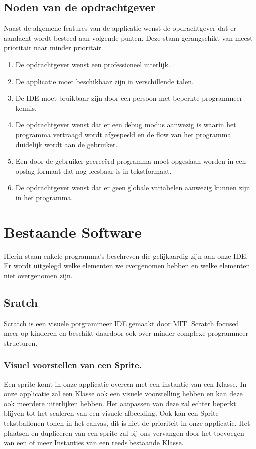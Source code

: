 \documentclass[]{article}
\begin{document}
\subsection{Noden van de opdrachtgever}
Naast de algemene features van de applicatie wenst de opdrachtgever dat er aandacht wordt besteed aan volgende punten. Deze staan gerangschikt van meest prioritair naar minder prioritair.
\begin{enumerate}
\item De opdrachtgever wenst een professioneel uiterlijk.
\item De applicatie moet beschikbaar zijn in verschillende talen.
\item De IDE moet bruikbaar zijn door een persoon met beperkte programmeer kennis.
\item De opdrachtgever wenst dat er een debug modus aanwezig is waarin het programma vertraagd wordt afgespeeld en de flow van het programma duidelijk wordt aan de gebruiker.
\item Een door de gebruiker gecree\"{e}rd programma moet opgeslaan worden in een opslag formaat  dat nog leesbaar is in tekstformaat.
\item De opdrachtgever wenst dat er geen globale variabelen aanwezig kunnen zijn in het programma.
\end{enumerate}
 
\section{Bestaande Software}
Hierin staan enkele programma's beschreven die gelijkaardig zijn aan onze IDE. Er wordt uitgelegd welke elementen we overgenomen hebben en welke elementen niet overgenomen zijn.
\label{software}
\subsection{Sratch}
Scratch \cite{scratch} is een visuele porgrammeer IDE gemaakt door MIT. Scratch focused meer op kinderen en beschikt daardoor ook over minder complexe programmeer structuren.
\subsubsection{Visuel voorstellen van een Sprite.}
Een sprite komt in onze applicatie overeen met een instantie van een Klasse. In onze applicatie zal een Klasse ook een visuele voorstelling hebben en kan deze ook meerdere uiterlijken hebben. Het aanpassen van deze zal echter beperkt blijven tot het scaleren van een visuele afbeelding. Ook kan een Sprite tekstballonen tonen in het canvas, dit is niet de prioriteit in onze applicatie. Het plaatsen en dupliceren van een sprite zal bij ons vervangen door het toevoegen van een of meer Instanties van een reeds bestaande Klasse.
\end{document}
